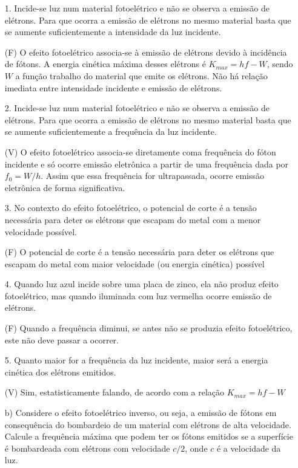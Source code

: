 \begin{enumerate}[start=1,label={\bfseries Q\arabic*.}]
\item[1.] Incide-se luz num material fotoelétrico e não se observa a emissão de elétrons. Para que ocorra a emissão de elétrons no mesmo material basta que se aumente suficientemente a intensidade da luz incidente.

\resposta (F) O efeito fotoelétrico associa-se à emissão de elétrons devido à incidência de fótons. A energia cinética máxima desses elétrons é $K_{max} = hf - W$, sendo $W$ a função trabalho do material que emite os elétrons. Não há relação imediata entre intensidade incidente e emissão de elétrons.

\item[2.] Incide-se luz num material fotoelétrico e não se observa a emissão de elétrons. Para que ocorra a emissão de elétrons no mesmo material basta que se aumente suficientemente a frequência da luz incidente.

\resposta (V) O efeito fotoelétrico associa-se diretamente coma frequência do fóton incidente e só ocorre emissão eletrônica a partir de uma frequência dada por $f_{0} = W/h$. Assim que essa frequência for ultrapassada, ocorre emissão eletrônica de forma significativa.

\item[3.] No contexto do efeito fotoelétrico, o potencial de corte é a tensão necessária para deter os elétrons que escapam do metal com a menor velocidade possível.

\resposta (F) O potencial de corte é a tensão necessária para deter os elétrons que escapam do metal com maior velocidade (ou energia cinética) possível

\item[4.] Quando luz azul incide sobre uma placa de zinco, ela não produz efeito fotoelétrico, mas quando iluminada com luz vermelha ocorre emissão de elétrons.

\resposta (F) Quando a frequência diminui, se antes não se produzia efeito fotoelétrico, este não deve passar a ocorrer.

\item[5.] Quanto maior for a frequência da luz incidente, maior será a energia cinética dos elétrons emitidos.

\resposta (V) Sim, estatisticamente falando, de acordo com a relação $K_{max} = hf - W$

b) Considere o efeito fotoelétrico inverso, ou seja, a emissão de fótons em consequência do bombardeio de um material com elétrons de alta velocidade. Calcule a frequência máxima que podem ter os fótons emitidos se a superfície é bombardeada com elétrons com velocidade $c/2$, onde $c$ é a velocidade da luz.






\end{enumerate}
